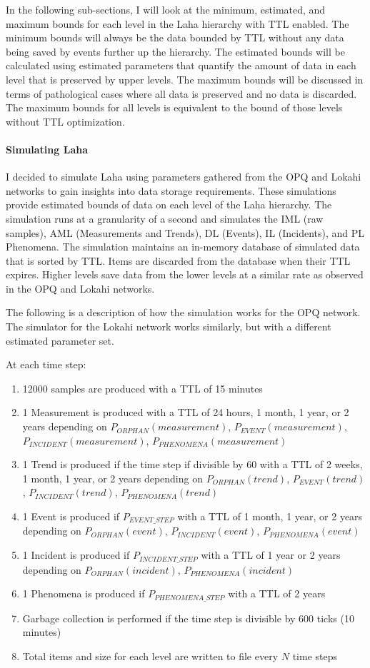 In the following sub-sections, I will look at the minimum, estimated, and maximum bounds for each level in the Laha hierarchy with TTL enabled. The minimum bounds will always be the data bounded by TTL without any data being saved by events further up the hierarchy. The estimated bounds will be calculated using estimated parameters that quantify the amount of data in each level that is preserved by upper levels. The maximum bounds will be discussed in terms of pathological cases where all data is preserved and no data is discarded. The maximum bounds for all levels is equivalent to the bound of those levels without TTL optimization.

\paragraph{Simulating Laha}

I decided to simulate Laha using parameters gathered from the OPQ and Lokahi networks to gain insights into data storage requirements. These simulations provide estimated bounds of data on each level of the Laha hierarchy. The simulation runs at a granularity of a second and simulates the IML (raw samples), AML (Measurements and Trends), DL (Events), IL (Incidents), and PL Phenomena. The simulation maintains an in-memory database of simulated data that is sorted by TTL. Items are discarded from the database when their TTL expires. Higher levels save data from the lower levels at a similar rate as observed in the OPQ and Lokahi networks.

The following is a description of how the simulation works for the OPQ network. The simulator for the Lokahi network works similarly, but with a different estimated parameter set.

At each time step:
\begin{enumerate}
	\item 12000 samples are produced with a TTL of 15 minutes
	\item 1 Measurement is produced with a TTL of 24 hours, 1 month, 1 year, or 2 years depending on $P_{ORPHAN}(measurement)$, $P_{EVENT}(measurement)$, $P_{INCIDENT}(measurement)$, $P_{PHENOMENA}(measurement)$
	\item 1 Trend is produced if the time step if divisible by 60 with a TTL of 2 weeks, 1 month, 1 year, or 2 years depending on $P_{ORPHAN}(trend)$, $P_{EVENT}(trend)$, $P_{INCIDENT}(trend)$, $P_{PHENOMENA}(trend)$
	\item 1 Event is produced if $P_{EVENT\_STEP}$ with a TTL of 1 month, 1 year, or 2 years depending on $P_{ORPHAN}(event)$, $P_{INCIDENT}(event)$, $P_{PHENOMENA}(event)$
	\item 1 Incident is produced if $P_{INCIDENT\_STEP}$ with a TTL of 1 year or 2 years depending on $P_{ORPHAN}(incident)$, $P_{PHENOMENA}(incident)$
	\item 1 Phenomena is produced if $P_{PHENOMENA\_STEP}$ with a TTL of 2 years
	\item Garbage collection is performed if the time step is divisible by 600 ticks (10 minutes)
	\item Total items and size for each level are written to file every $N$ time steps
\end{enumerate}

